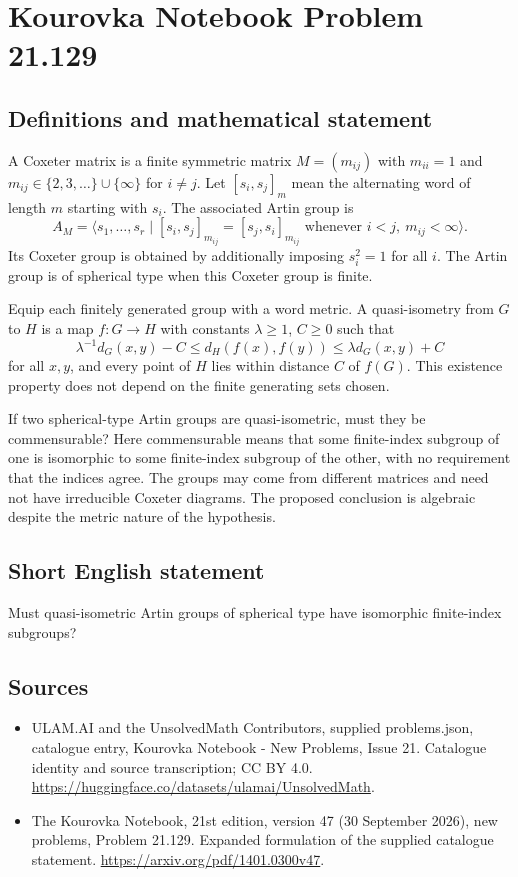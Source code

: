 \documentclass[11pt,a4paper]{article}
\begin{document}
\section*{Kourovka Notebook Problem 21.129}\label{statement}

\subsection{Definitions and mathematical statement}
A Coxeter matrix is a finite symmetric matrix $M=(m_{ij})$ with $m_{ii}=1$ and $m_{ij}\in\{2,3,\ldots\}\cup\{\infty\}$ for $i\ne j$. Let $[s_i,s_j]_m$ mean the alternating word of length $m$ starting with $s_i$. The associated Artin group is
\[
 A_M=\langle s_1,\ldots,s_r\mid
 [s_i,s_j]_{m_{ij}}=[s_j,s_i]_{m_{ij}}
 \text{ whenever }i<j,\ m_{ij}<\infty\rangle.
\]
Its Coxeter group is obtained by additionally imposing $s_i^2=1$ for all $i$. The Artin group is of spherical type when this Coxeter group is finite.

Equip each finitely generated group with a word metric. A quasi-isometry from $G$ to $H$ is a map $f:G\to H$ with constants $\lambda\ge1$, $C\ge0$ such that
\[
 \lambda^{-1}d_G(x,y)-C\le d_H(f(x),f(y))
 \le\lambda d_G(x,y)+C
\]
for all $x,y$, and every point of $H$ lies within distance $C$ of $f(G)$. This existence property does not depend on the finite generating sets chosen.

If two spherical-type Artin groups are quasi-isometric, must they be commensurable? Here commensurable means that some finite-index subgroup of one is isomorphic to some finite-index subgroup of the other, with no requirement that the indices agree. The groups may come from different matrices and need not have irreducible Coxeter diagrams. The proposed conclusion is algebraic despite the metric nature of the hypothesis.
\subsection{Short English statement}
Must quasi-isometric Artin groups of spherical type have isomorphic finite-index subgroups?
\subsection{Sources}
\begin{itemize}
\item[S1] ULAM.AI and the UnsolvedMath Contributors, supplied problems.json, catalogue entry, Kourovka Notebook - New Problems, Issue 21. Catalogue identity and source transcription; CC BY 4.0.
\url{https://huggingface.co/datasets/ulamai/UnsolvedMath}.
\item[S2] The Kourovka Notebook, 21st edition, version 47 (30 September 2026), new problems, Problem 21.129. Expanded formulation of the supplied catalogue statement.
\url{https://arxiv.org/pdf/1401.0300v47}.
\end{itemize}
\end{document}
